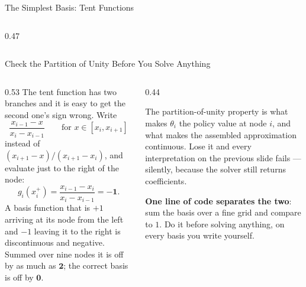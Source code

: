 \begin{frame}{The Simplest Basis: Tent Functions}
\begin{columns}[T]
\begin{column}{0.47\textwidth}
\begin{center}
\end{center}
\end{column}
\end{columns}
\vspace{1mm}
\end{frame}

\begin{frame}{Check the Partition of Unity Before You Solve Anything}
\begin{columns}[T]
\begin{column}{0.53\textwidth}
\small
The tent function has two branches and it is easy to get the second one's sign wrong. Write
\[
  \frac{x_{i-1}-x}{x_{i}-x_{i-1}}\qquad\text{for }x\in[x_i,x_{i+1}]
\]
instead of $(x_{i+1}-x)/(x_{i+1}-x_i)$, and evaluate just to the right of the node:
\[
  g_i(x_i^{+})=\frac{x_{i-1}-x_i}{x_i-x_{i-1}}=\mathbf{-1}.
\]
A basis function that is $+1$ arriving at its node from the left and $-1$ leaving it to the right is
discontinuous and negative. Summed over nine nodes it is off by as much as $\mathbf{2}$; the correct
basis is off by $\mathbf{0}$.
\end{column}
\begin{column}{0.44\textwidth}
\begin{cautionbox}[title=\textbf{Why it matters}]\small
The partition-of-unity property is what makes $\theta_i$ the policy value at node $i$, and what makes
the assembled approximation continuous. Lose it and every interpretation on the previous slide fails
--- silently, because the solver still returns coefficients.
\end{cautionbox}
\medskip
\begin{takeawaybox}\footnotesize
\textbf{One line of code separates the two}: sum the basis over a fine grid and compare to $1$. Do it
before solving anything, on every basis you write yourself.
\end{takeawaybox}
\end{column}
\end{columns}
\vspace{1mm}
\end{frame}

